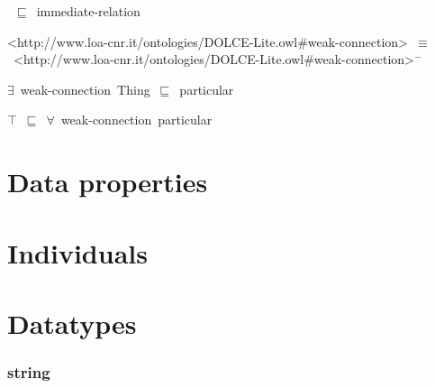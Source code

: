 \documentclass{article}
\begin{document}
~\ensuremath{\sqsubseteq}~immediate-relation

<http://www.loa-cnr.it/ontologies/DOLCE-Lite.owl#weak-connection>~\ensuremath{\equiv}~<http://www.loa-cnr.it/ontologies/DOLCE-Lite.owl#weak-connection>\ensuremath{^-}

\ensuremath{\exists}~weak-connection~Thing~\ensuremath{\sqsubseteq}~particular

\ensuremath{\top}~\ensuremath{\sqsubseteq}~\ensuremath{\forall}~weak-connection~particular

\section*{Data properties}\section*{Individuals}\section*{Datatypes}\subsubsection*{string}
\end{document}
